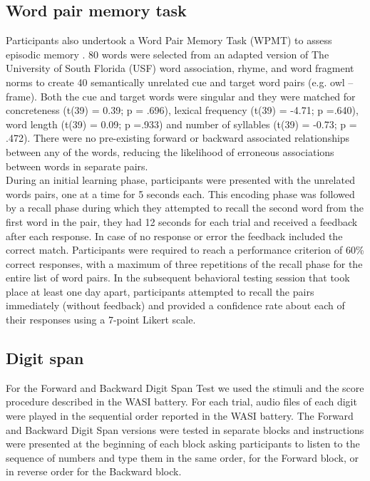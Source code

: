 \subsection{Word pair memory task}
Participants also undertook a Word Pair Memory Task (WPMT) to assess episodic memory \cite{Cairney2016}. 80 words were selected from an adapted version of The University of South Florida (USF) word association, rhyme, and word fragment norms \cite{Nelson2004} to create 40 semantically unrelated cue and target word pairs (e.g. owl – frame). Both the cue and target words were singular and they were matched for concreteness (t(39) = 0.39; p = .696), lexical frequency (t(39) = -4.71; p =.640), word length (t(39) = 0.09; p =.933) and number of syllables (t(39) = -0.73; p = .472). There were no pre-existing forward or backward associated relationships between any of the words, reducing the likelihood of erroneous associations between words in separate pairs.\\
During an initial learning phase, participants were presented with the unrelated words pairs, one at a time for 5 seconds each. This encoding phase was followed by a recall phase during which they attempted to recall the second word from the first word in the pair, they had 12 seconds for each trial and received a feedback after each response. In case of no response or error the feedback included the correct match. Participants were required to reach a performance criterion of 60\% correct responses, with a maximum of three repetitions of the recall phase for the entire list of word pairs. In the subsequent behavioral testing session that took place at least one day apart, participants attempted to recall the pairs immediately (without feedback) and provided a confidence rate about each of their responses using a 7-point Likert scale. 

\subsection{Digit span}
For the Forward and Backward Digit Span Test we used the stimuli and the score procedure described in the WASI battery. For each trial, audio files of each digit were played in the sequential order reported in the WASI battery. The Forward and Backward Digit Span versions were tested in separate blocks and instructions were presented at the beginning of each block asking participants to listen to the sequence of numbers and type them in the same order, for the Forward block, or in reverse order for the Backward block. 


